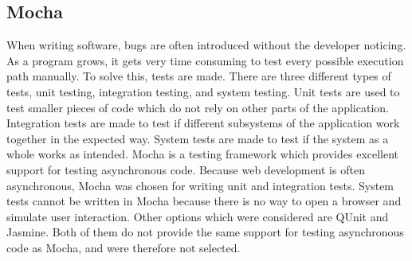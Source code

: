 \subsection{Mocha}
When writing software, bugs are often introduced without the developer noticing. As a program grows, it gets very time consuming to test every possible execution path manually. To solve this, tests are made. There are three different types of tests, unit testing, integration testing, and system testing. Unit tests are used to test smaller pieces of code which do not rely on other parts of the application. Integration tests are made to test if different subsystems of the application work together in the expected way. System tests are made to test if the system as a whole works as intended. Mocha\cite{mocha} is a testing framework which provides excellent support for testing asynchronous code. Because web development is often asynchronous, Mocha was chosen for writing unit and integration tests. System tests cannot be written in Mocha because there is no way to open a browser and simulate user interaction. Other options which were considered are QUnit\cite{qunit} and Jasmine\cite{jasmine}. Both of them do not provide the same support for testing asynchronous code as Mocha, and were therefore not selected.